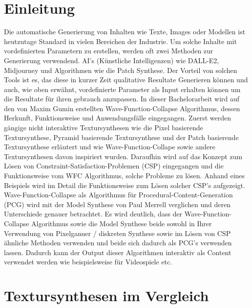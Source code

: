 \documentclass[12pt, a4paper,twoside,openright]{report} %
\begin{document}
\tableofcontents

\chapter{Einleitung}

Die automatische Generierung von Inhalten wie Texte, Images oder Modellen ist heutzutage Standard in vielen Bereichen der Industrie.
Um solche Inhalte mit vordefinierten Parametern zu erstellen, werden oft zwei Methoden zur Generierung verwendend.
AI's {(Künstliche Intelligenzen)} wie DALL-E2, Midjourney und Algorithmen wie die Patch Synthese.
Der Vorteil von solchen Tools ist es, das diese in kurzer Zeit qualitative Resultate Generieren können und auch, wie oben erwähnt, vordefinierte Parameter als Input erhalten können
um die Resultate für ihren gebrauch anzupassen.
In dieser Bachelorarbeit wird auf den von Maxim Gumin erstellten Wave-Function-Collapse Algorithmus, dessen Herkunft, Funktionsweise und Anwendungsfälle eingegangen.
Zuerst werden gängige nicht interaktive Textursynthesen wie die Pixel basierende Textursynthese, Pyramid basierende Textursynthese und der Patch basierende Textursynthese erläutert
und wie Wave-Function-Collape sowie andere Textursynthesen davon inspiriert wurden.
Daraufhin wird auf das Konzept zum Lösen von Constraint-Satisfaction-Problemen {(CSP)} eingegangen und die Funktionsweise vom WFC Algorithmus, solche Probleme zu lösen.
Anhand eines Beispiels wird im Detail die Funktionsweise zum Lösen solcher CSP's aufgezeigt.
Wave-Function-Collapse als Algorithmus für Procedural-Content-Generation {(PCG)} wird mit der Model Synthese von Paul Merrell verglichen und deren Unterschiede genauer betrachtet.
Es wird deutlich, dass der Wave-Function-Collapse Algorithmus sowie die Model Synthese beide sowohl in Ihrer Verwendung von Pixelganuer / diskreten Synthese sowie im Lösen von
CSP ähnliche Methoden verwenden und beide sich dadurch als PCG's verwenden lassen.
Dadurch kann der Output dieser Algorithmen interaktiv als Content verwendet werden wie beispielsweise für Videospiele etc.

\chapter{Textursynthesen im Vergleich}
\end{document}
